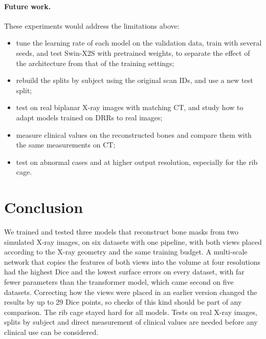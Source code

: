 \documentclass[11pt]{article}
\begin{document}
\paragraph{Future work.}
These experiments would address the limitations above:
\begin{itemize}
\item tune the learning rate of each model on the validation data, train with several seeds, and test Swin-X2S with pretrained weights, to separate the effect of the architecture from that of the training settings;
\item rebuild the splits by subject using the original scan IDs, and use a new test split;
\item test on real biplanar X-ray images with matching CT, and study how to adapt models trained on DRRs to real images;
\item measure clinical values on the reconstructed bones and compare them with the same measurements on CT;
\item test on abnormal cases and at higher output resolution, especially for the rib cage.
\end{itemize}

\section{Conclusion}
We trained and tested three models that reconstruct bone masks from two simulated X-ray images, on six datasets with one pipeline, with both views placed according to the X-ray geometry and the same training budget. A multi-scale network that copies the features of both views into the volume at four resolutions had the highest Dice and the lowest surface errors on every dataset, with far fewer parameters than the transformer model, which came second on five datasets. Correcting how the views were placed in an earlier version changed the results by up to 29 Dice points, so checks of this kind should be part of any comparison. The rib cage stayed hard for all models. Tests on real X-ray images, splits by subject and direct measurement of clinical values are needed before any clinical use can be considered.

\end{document}

